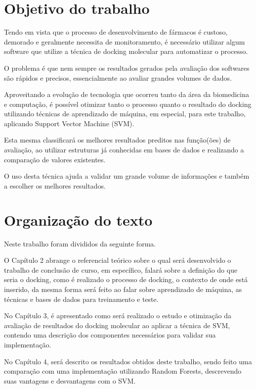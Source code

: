 \documentclass[tcc, capa]{texucpel}
\begin{document}
\section{Objetivo do trabalho}%
Tendo em vista que o processo de desenvolvimento de fármacos é custoso, demorado e geralmente necessita de monitoramento, é necessário utilizar algum software que utilize a técnica de docking molecular para automatizar o processo.

O problema é que nem sempre os resultados gerados pela avaliação dos softwares são rápidos e precisos, essencialmente ao avaliar grandes volumes de dados.

Aproveitando a evolução de tecnologia que ocorreu tanto da área da biomedicina e computação, é possível otimizar tanto o processo quanto o resultado do docking utilizando técnicas de aprendizado de máquina, em especial, para este trabalho, aplicando Support Vector Machine (SVM).

Esta mesma classificará os melhores resultados preditos nas função(ões) de avaliação, ao utilizar estruturas já conhecidas em bases de dados e realizando a comparação de valores existentes.

O uso desta técnica ajuda a validar um grande volume de informações e também a escolher os melhores resultados.


\section{Organização do texto}
Neste trabalho foram divididos da seguinte forma.

O Capítulo 2 abrange o referencial teórico sobre o qual será desenvolvido o trabalho de conclusão de curso, em específico, falará sobre a definição do que seria o docking, como é realizado o processo de docking, o contexto de onde está inserido, da mesma forma será feito ao falar sobre aprendizado de máquina, as técnicas e bases de dados para treinamento e teste.

No Capítulo 3, é apresentado como será realizado o estudo e otimização da avaliação de resultados do docking molecular ao aplicar a técnica de SVM, contendo uma descrição dos componentes necessários para validar sua implementação.

No Capítulo 4, será descrito os resultados obtidos deste trabalho, sendo feito uma comparação com uma implementação utilizando Random Forests, descrevendo suas vantagens e desvantagens com o SVM.
\end{document}
